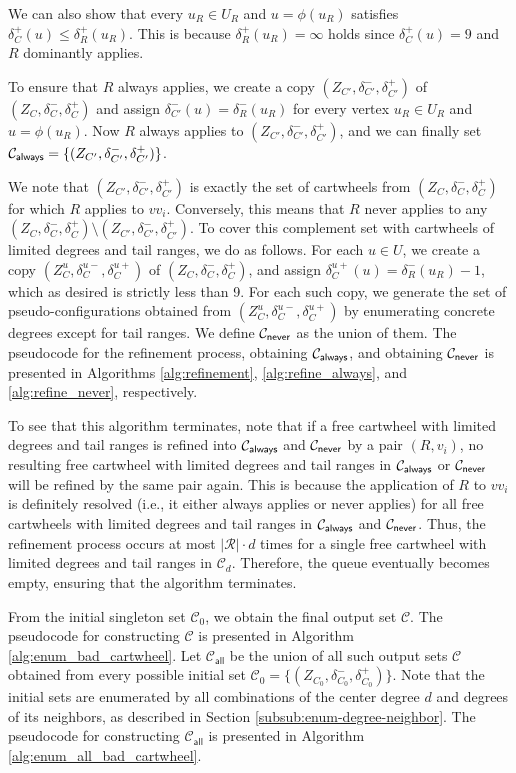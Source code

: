 \documentclass[10pt,a4paper]{article}
\begin{document}
We can also show that every 
$u_R\in U_R$ and $u=\phi(u_R)$ satisfies
$\delta_C^+(u) \leq \delta_R^+(u_R)$.
This is because $\delta_R^+(u_R)=\infty$ holds since $\delta_C^+(u)=9$ and $R$ dominantly applies.

To ensure that $R$ always applies, we create a copy $(Z_{C'}, \delta_{C'}^-, \delta_{C'}^+)$ of $(Z_C, \delta_C^-, \delta_C^+)$ and assign $\delta_{C'}^-(u)=\delta_R^-(u_R)$ for every vertex $u_R\in U_R$ and $u=\phi(u_R)$.
Now $R$ always applies to
$(Z_{C'}, \delta_{C'}^-, \delta_{C'}^+)$, and we can finally set
$\mathcal{C}_{\textsf{always}}=\{(Z_{C'}, \delta_{C'}^-, \delta_{C'}^+)\}$.

We note that $(Z_{C'}, \delta_{C'}^-, \delta_{C'}^+)$ is exactly the set of cartwheels from
$(Z_C, \delta_C^-, \delta_C^+)$ for which $R$ applies to $vv_i$. Conversely, this means that $R$ never applies to any 
$(Z_C, \delta_C^-, \delta_C^+)\setminus (Z_{C'}, \delta_{C'}^-, \delta_{C'}^+)$. To cover this complement set with cartwheels of limited degrees and tail ranges, we do as follows.
For each $u \in U$, we create a copy $(Z_{C}^u, \delta_{C}^{u-}, \delta_{C}^{u+})$ of $(Z_C, \delta_C^-, \delta_C^+)$, and assign $\delta_{C}^{u+}(u)=\delta_R^-(u_R)-1$, which as desired is strictly less than 9.
For each such copy, we generate the set of pseudo-configurations obtained from $(Z_{C}^u, \delta_{C}^{u-}, \delta_{C}^{u+})$ by enumerating concrete degrees except for tail ranges.
We define $\mathcal{C}_{\textsf{never}}$ as the union of them.
The pseudocode for the refinement process, obtaining $\mathcal{C}_{\textsf{always}}$, and obtaining $\mathcal{C}_{\textsf{never}}$ is presented in Algorithms \ref{alg:refinement}, \ref{alg:refine_always}, and \ref{alg:refine_never}, respectively.

To see that this algorithm terminates, note that if a free cartwheel with limited degrees and tail ranges is refined into $\mathcal{C}_{\textsf{always}}$ and $\mathcal{C}_{\textsf{never}}$ by a pair $(R, v_i)$, no resulting free cartwheel with limited degrees and tail ranges in $\mathcal{C}_{\textsf{always}}$ or $\mathcal{C}_{\textsf{never}}$ will be refined by the same pair again.
This is because the application of $R$ to $vv_i$ is definitely resolved (i.e., it either always applies or never applies) for all free cartwheels with limited degrees and tail ranges in $\mathcal{C}_{\textsf{always}}$ and $\mathcal{C}_{\textsf{never}}$.
Thus, the refinement process occurs at most $|\mathcal{R}| \cdot d$ times for a single free cartwheel with limited degrees and tail ranges in $\mathcal{C}_d$.
Therefore, the queue eventually becomes empty, ensuring that the algorithm terminates.

From the initial singleton set $\mathcal{C}_0$, we obtain the final output set $\mathcal{C}$.
The pseudocode for constructing $\mathcal{C}$ is presented in Algorithm \ref{alg:enum_bad_cartwheel}.
Let $\mathcal{C}_{\textsf{all}}$ be the union of all such output sets $\mathcal{C}$ obtained from every possible initial set $\mathcal{C}_0=\{(Z_{C_0}, \delta_{C_0}^-, \delta_{C_0}^+)\}$.
Note that the initial sets are enumerated by all combinations of the center degree $d$ and degrees of its neighbors, as described in Section \ref{subsub:enum-degree-neighbor}.
The pseudocode for constructing $\mathcal{C}_{\textsf{all}}$ is presented in Algorithm \ref{alg:enum_all_bad_cartwheel}.
\end{document}
